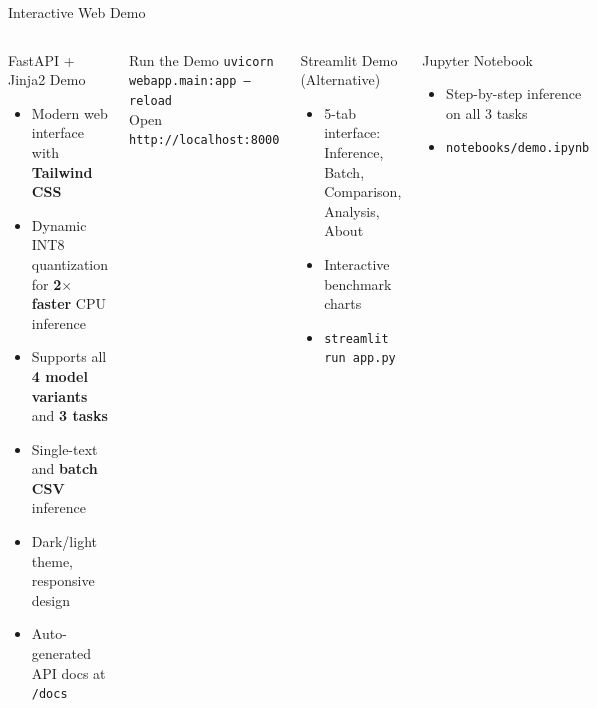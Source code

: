 \documentclass[10pt, aspectratio=169]{beamer}
\begin{document}
\begin{frame}[shrink=5]{Interactive Web Demo}
  \begin{columns}[T]
    \begin{block}{FastAPI + Jinja2 Demo}
      \begin{itemize}
        \item Modern web interface with \textbf{Tailwind CSS}
        \item Dynamic INT8 quantization for \textbf{2$\times$ faster} CPU inference
        \item Supports all \textbf{4 model variants} and \textbf{3 tasks}
        \item Single-text and \textbf{batch CSV} inference
        \item Dark/light theme, responsive design
        \item Auto-generated API docs at \texttt{/docs}
      \end{itemize}
    \end{block}
    \vspace{0.2cm}
    \begin{exampleblock}{Run the Demo}
      \texttt{uvicorn webapp.main:app --reload}\\
      Open \texttt{http://localhost:8000}
    \end{exampleblock}

    \begin{block}{Streamlit Demo (Alternative)}
      \begin{itemize}
        \item 5-tab interface: Inference, Batch, Comparison, Analysis, About
        \item Interactive benchmark charts
        \item \texttt{streamlit run app.py}
      \end{itemize}
    \end{block}
    \vspace{0.2cm}
    \begin{block}{Jupyter Notebook}
      \begin{itemize}
        \item Step-by-step inference on all 3 tasks
        \item \texttt{notebooks/demo.ipynb}
      \end{itemize}
    \end{block}
  \end{columns}
\end{frame}
\end{document}
